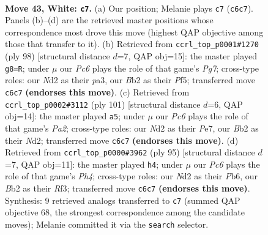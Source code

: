 \documentclass[11pt]{article}
\begin{document}
\clearpage

\begin{figure}[p]\centering
\begin{subfigure}{0.46\textwidth}\centering
\resizebox{\linewidth}{!}{%
\newchessgame
\chessboard[
  setfen={5k2/8/2P3r1/8/7K/8/1B1N4/8 w - - 1 43},
  showmover=false,
  pgfstyle=straightmove, color=movearrow, markmove={c6-c7}
]}
\caption{}
\end{subfigure}\hfill
\begin{subfigure}{0.46\textwidth}\centering
\resizebox{\linewidth}{!}{%
\newchessgame
\chessboard[
  setfen={8/5KP1/8/5P2/8/p7/6r1/3k4 w - - 0 50},
  showmover=false,
  pgfstyle=straightmove, color=movearrow, markmove={g7-g8}
]}
\caption{}
\end{subfigure}
\\[4pt]
\begin{subfigure}{0.46\textwidth}\centering
\resizebox{\linewidth}{!}{%
\newchessgame
\chessboard[
  setfen={8/p1k1p3/8/3K4/R7/8/3n4/8 b - - 0 51},
  showmover=false,
  pgfstyle=straightmove, color=movearrow, markmove={a7-a5}
]}
\caption{}
\end{subfigure}\hfill
\begin{subfigure}{0.46\textwidth}\centering
\resizebox{\linewidth}{!}{%
\newchessgame
\chessboard[
  setfen={2k5/7R/1p6/1P2K2p/8/5r2/8/8 b - - 4 48},
  showmover=false,
  pgfstyle=straightmove, color=movearrow, markmove={h5-h4}
]}
\caption{}
\end{subfigure}
\caption{\textbf{Move 43, White: \texttt{c7}.} (a) Our position; Melanie plays \texttt{c7} (\texttt{c6c7}). Panels (b)--(d) are the retrieved master positions whose correspondence most drove this move (highest QAP objective among those that transfer to it). (b) Retrieved from \texttt{ccrl\_top\_p0001\#1270} (ply 98) [structural distance $d$=7, QAP obj=15]: the master played \texttt{g8=R}; under $\mu$ our \emph{Pc6} plays the role of that game's \emph{Pg7}; cross-type roles: our \emph{N}d2 as their \emph{p}a3, our \emph{B}b2 as their \emph{P}f5; transferred move \texttt{c6c7} \textbf{(endorses this move)}. (c) Retrieved from \texttt{ccrl\_top\_p0002\#3112} (ply 101) [structural distance $d$=6, QAP obj=14]: the master played \texttt{a5}; under $\mu$ our \emph{Pc6} plays the role of that game's \emph{Pa2}; cross-type roles: our \emph{N}d2 as their \emph{P}e7, our \emph{B}b2 as their \emph{N}d2; transferred move \texttt{c6c7} \textbf{(endorses this move)}. (d) Retrieved from \texttt{ccrl\_top\_p0000\#3962} (ply 95) [structural distance $d$=7, QAP obj=11]: the master played \texttt{h4}; under $\mu$ our \emph{Pc6} plays the role of that game's \emph{Ph4}; cross-type roles: our \emph{N}d2 as their \emph{P}b6, our \emph{B}b2 as their \emph{R}f3; transferred move \texttt{c6c7} \textbf{(endorses this move)}. Synthesis: 9 retrieved analogs transferred to \texttt{c7} (summed QAP objective 68, the strongest correspondence among the candidate moves); Melanie committed it via the \texttt{search} selector.}
\label{fig:thought-m84}
\end{figure}
\end{document}
